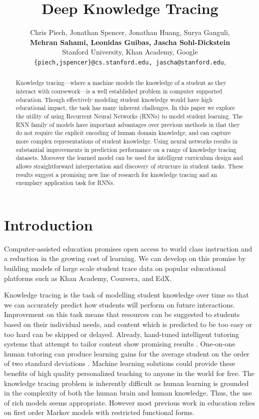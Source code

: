 \documentclass{article} \usepackage{nips,times}
\title{Deep Knowledge Tracing}
\author{
Chris Piech, Jonathan Spencer, Jonathan Huang, Surya Ganguli, \\ \textbf{
Mehran Sahami, Leonidas Guibas, Jascha Sohl-Dickstein } \\
Stanford University, Khan Academy, Google \\
\texttt{\{piech,jspencer\}@cs.stanford.edu, jascha@stanford.edu},
}
\begin{document}
\maketitle

\vspace{-4mm}

\begin{abstract}
Knowledge tracing---where a machine models the knowledge of a student as they interact with coursework---is a well established problem in computer supported education. Though effectively modeling student knowledge would have high educational impact, the task has many inherent challenges. In this paper we explore the utility of using Recurrent Neural Networks (RNNs) to model student learning. The RNN family of models have important advantages over previous methods in that they do not require the explicit encoding of human domain knowledge, and can capture more complex representations of student knowledge. Using neural networks results in substantial improvements in prediction performance on a range of knowledge tracing datasets. Moreover the learned model can be used for intelligent curriculum design and allows straightforward interpretation and discovery of structure in student tasks. These results suggest a promising new line of research for knowledge tracing and an exemplary application task for RNNs.
\end{abstract}

\section{Introduction}


Computer-assisted education promises open access to world class instruction and a reduction in the growing cost of learning.
We can develop on this promise by building models of large scale student trace data on popular educational platforms such as Khan Academy, Coursera, and EdX.





Knowledge tracing is the task of modelling student knowledge over time so that we can accurately predict how students will perform on future interactions.  Improvement on this task means that resources can be suggested to students based on their individual needs, and content which is predicted to be too easy or too hard
can be skipped or delayed. Already, hand-tuned intelligent tutoring systems that attempt to tailor content show promising results \cite{polson2013foundations}. One-on-one human tutoring 
can produce learning gains for the average student on the order of two standard deviations \cite{corbett2001cognitive}.
Machine learning solutions could provide these benefits of 
high quality personalized teaching to anyone in the world for free. The knowledge tracing problem is inherently difficult as human learning is grounded in the complexity of both the human brain and human knowledge.
Thus, the use of rich models seems appropriate.
However most previous work in education relies on first order Markov models with restricted functional forms.
\end{document}
